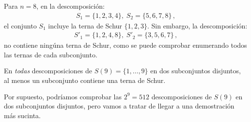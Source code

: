 \begin{example} Para $n=8$, en la descomposición:
\begin{align}
S_1 = \{1,2,3,4\},\; S_2 = \{5,6,7,8\}\,,
\label{eq.schur0}
\end{align}
el conjunto $S_1$ incluye la terna de Schur $\{1,2,3\}$.
Sin embargo, la descomposición:
\begin{align}
S'_1 = \{1,2,4,8\},\; S'_2 = \{3,5,6,7\}\,,
\label{eq:schur1}
\end{align}
no contiene ningúna terna de Schur, como se puede comprobar enumerando todos las ternas de cada subconjunto.
\end{example}

\begin{theorem}
En \emph{todas} descomposiciones de $S(9)=\{1,\ldots,9\}$ en dos subconjuntos disjuntos, al menos un subconjunto contiene una terna de Schur.
\end{theorem}
Por supuesto, podríamos comprobar las $2^9=512$ descomposiciones de $S(9)$ en dos subconjuntos disjuntos, pero vamos a tratar de llegar a una demostración más sucinta.
